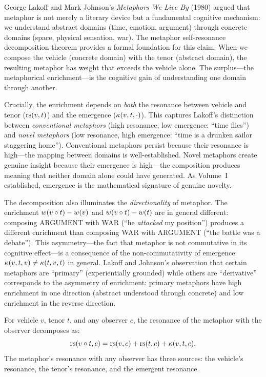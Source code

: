 \begin{interpretation}
\label{interp:lakoff-cmt}
George Lakoff and Mark Johnson's \textit{Metaphors We Live By} (1980) argued that metaphor is not merely a literary device but a fundamental cognitive mechanism: we understand abstract domains (time, emotion, argument) through concrete domains (space, physical sensation, war).  The metaphor self-resonance decomposition theorem provides a formal foundation for this claim.  When we compose the vehicle (concrete domain) with the tenor (abstract domain), the resulting metaphor has weight that exceeds the vehicle alone.  The surplus---the metaphorical enrichment---is the cognitive gain of understanding one domain through another.

Crucially, the enrichment depends on \emph{both} the resonance between vehicle and tenor ($\mathrm{rs}(v, t)$) and the emergence ($\kappa(v, t, \cdot)$).  This captures Lakoff's distinction between \emph{conventional metaphors} (high resonance, low emergence: ``time flies'') and \emph{novel metaphors} (low resonance, high emergence: ``time is a drunken sailor staggering home'').  Conventional metaphors persist because their resonance is high---the mapping between domains is well-established.  Novel metaphors create genuine insight because their emergence is high---the composition produces meaning that neither domain alone could have generated.  As Volume~I established, emergence is the mathematical signature of genuine novelty.

The decomposition also illuminates the \emph{directionality} of metaphor.  The enrichment $w(v \circ t) - w(v)$ and $w(v \circ t) - w(t)$ are in general different: composing ARGUMENT with WAR (``he \emph{attacked} my position'') produces a different enrichment than composing WAR with ARGUMENT (``the battle was a debate'').  This asymmetry---the fact that metaphor is not commutative in its cognitive effect---is a consequence of the non-commutativity of emergence: $\kappa(v, t, v) \neq \kappa(t, v, t)$ in general.  Lakoff and Johnson's observation that certain metaphors are ``primary'' (experientially grounded) while others are ``derivative'' corresponds to the asymmetry of enrichment: primary metaphors have high enrichment in one direction (abstract understood through concrete) and low enrichment in the reverse direction.
\end{interpretation}

\begin{theorem}
\label{thm:metaphor-observer}
For vehicle $v$, tenor $t$, and any observer $c$, the resonance of the metaphor with the observer decomposes as:
\[
  \mathrm{rs}(v \circ t, c) = \mathrm{rs}(v, c) + \mathrm{rs}(t, c) + \kappa(v, t, c).
\]
The metaphor's resonance with any observer has three sources: the vehicle's resonance, the tenor's resonance, and the emergent resonance.
\end{theorem}

